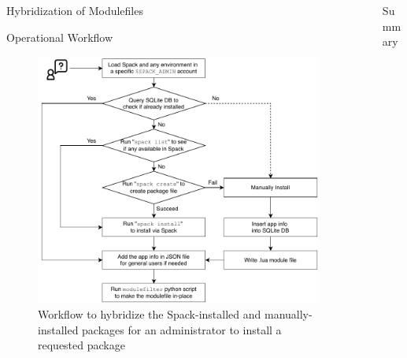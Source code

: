 \documentclass[final]{beamer}
\newlength{\sepwid}
\newlength{\onecolwid}
\begin{document}
\begin{frame}[t]
\begin{columns}[t]
\begin{column}{\onecolwid}
\begin{block}{Hybridization of Modulefiles}
\end{block}


\vspace{-2em}
\begin{block}{Operational Workflow}

\begin{figure}
  \centerline{\includegraphics[width=0.8\linewidth]{figures/spack_h2_hybrid_flow}}
  \caption{Workflow to hybridize the Spack-installed and manually-installed packages for an administrator to install a requested package}
\end{figure}


\end{block}

\end{column} %


\begin{column}{\sepwid}\end{column} %

\begin{column}{\onecolwid} %


\begin{block}{Summary}


\end{block}
\end{column}
\end{columns}
\end{frame}
\end{document}
